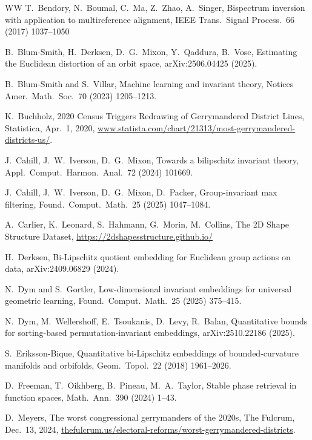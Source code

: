\documentclass{article}
\theoremstyle{plain}
\theoremstyle{definition}
\begin{document}
{\begin{thebibliography}{WW}
T.~Bendory, N.~Boumal, C.~Ma, Z.~Zhao, A.~Singer, 
Bispectrum inversion with application to multireference alignment, 
IEEE Trans.\ Signal Process.\ 66 (2017) 1037--1050

B.\ Blum-Smith, H.\ Derksen, D.\ G.\ Mixon, Y.\ Qaddura, B.\ Vose,
Estimating the Euclidean distortion of an orbit space,
arXiv:2506.04425 (2025).

B.~Blum-Smith and S.~Villar,
Machine learning and invariant theory,
Notices Amer.\ Math.\ Soc.\ 70 (2023) 1205--1213.

K.\ Buchholz,
2020 Census Triggers Redrawing of Gerrymandered District Lines,
Statistica,
Apr.\ 1, 2020,
\url{www.statista.com/chart/21313/most-gerrymandered-districts-us/}.

J.\ Cahill, J.\ W.\ Iverson, D.\ G.\ Mixon,
Towards a bilipschitz invariant theory,
Appl.\ Comput.\ Harmon.\ Anal.\ 72 (2024) 101669.

J.\ Cahill, J.\ W.\ Iverson, D.\ G.\ Mixon, D.\ Packer,
Group-invariant max filtering,
Found.\ Comput.\ Math.\ 25 (2025) 1047--1084.

A.\ Carlier, K.\ Leonard, S.\ Hahmann, G.\ Morin, M.\ Collins,
The 2D Shape Structure Dataset,
\url{https://2dshapesstructure.github.io/}

H.~Derksen,
Bi-Lipschitz quotient embedding for Euclidean group actions on data,
arXiv:2409.06829 (2024).

N.~Dym and S.~Gortler,
Low-dimensional invariant embeddings for universal geometric learning,
Found.\ Comput.\ Math.\ 25 (2025) 375--415.

N.~Dym, M.~Wellershoff, E.~Tsoukanis, D.~Levy, R.~Balan,
Quantitative bounds for sorting-based permutation-invariant embeddings,
arXiv:2510.22186 (2025).

S.~Eriksson-Bique, 
Quantitative bi-Lipschitz embeddings of bounded-curvature manifolds and orbifolds, 
Geom.\ Topol.\ 22 (2018) 1961--2026.

D.\ Freeman, T.\ Oikhberg, B.\ Pineau, M.\ A.\ Taylor,
Stable phase retrieval in function spaces,
Math.\ Ann.\ 390 (2024) 1--43.

D.\ Meyers,
The worst congressional gerrymanders of the 2020s,
The Fulcrum,
Dec.\ 13, 2024,
\url{thefulcrum.us/electoral-reforms/worst-gerrymandered-districts}.


\end{thebibliography}}
\end{document}
